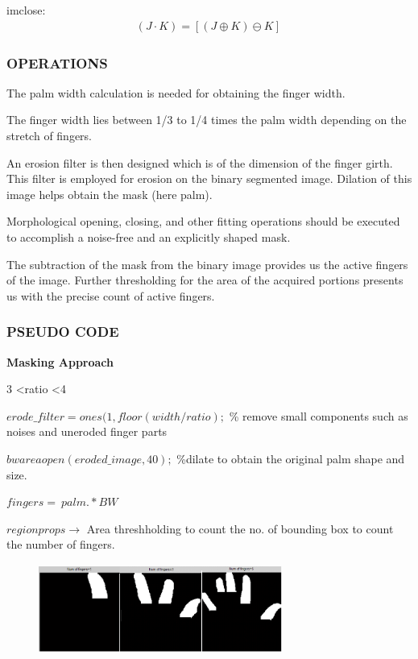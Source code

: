 \documentclass[conference]{IEEEtran}
\begin{document}
imclose:
\begin{equation}
\begin{aligned}
\left(J  \cdot  K\right) =  \left[\left(J \oplus K \right) \ominus K \right]\,
\end{aligned}
\end{equation}


\subsubsection{OPERATIONS}
The palm width calculation is needed for obtaining the finger width.

The finger width lies between 1/3 to 1/4 times the palm width depending on the stretch of fingers.

An erosion filter is then designed which is of the dimension of the finger girth. This filter is employed for erosion on the binary segmented image. Dilation of this image helps obtain the mask (here palm).

Morphological opening, closing, and other fitting operations should be executed to accomplish a noise-free and an explicitly shaped mask.

The subtraction of the mask \cite{7279962} from the binary image provides us the active fingers of the image. Further thresholding for the area of the acquired portions presents us with the precise count of active fingers.


\subsubsection{PSEUDO CODE}

\textbf{Masking Approach}
\begin{flushleft}
3 \textless ratio \textless 4

$erode\_filter=ones(1,floor(width/ratio); $ \% remove small components such as noises and uneroded finger parts
 
$bwareaopen(eroded\_image,40);$ \%dilate to obtain the original palm shape and size. 

$fingers=~palm.*BW$ 

$regionprops \rightarrow$ Area threshholding to count the no. of bounding box to count the number of fingers.

\begin{figure}[h!]
	\centering
	\includegraphics[width = 8cm, height = 3cm]{method1_1}
\end{figure}
\end{flushleft}
\end{document}
